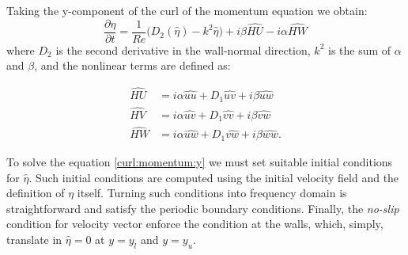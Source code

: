 Taking the y-component of the curl of the momentum equation we obtain:
\begin{equation}
\label{curl:momentum:y}
\frac{\partial \hat{\eta}}{\partial t}  = \frac{1}{Re}  \big( D_{2}(\hat{\eta}) - k^{2} \hat{\eta} \big) + i \beta \widehat{HU} -i \alpha \widehat{HW}
\end{equation}
where $D_{2}$ is the second derivative in the wall-normal direction, $k^{2}$ is the sum of $\alpha$ and $\beta$, and the nonlinear terms are defined as:

\begin{subequations}
\label{nonlinear:terms}
\begin{align}
\widehat{HU} &= i \alpha \widehat{uu} + D_{1} \widehat{uv} + i \beta \widehat{uw}\\ 
\widehat{HV} &= i \alpha \widehat{uv} + D_{1} \widehat{vv} + i \beta \widehat{vw}\\
\widehat{HW} &= i \alpha \widehat{uw} + D_{1} \widehat{vw} + i \beta \widehat{ww}.
\end{align}
\end{subequations}

To solve the equation \eqref{curl:momentum:y} we must set suitable initial conditions for $\hat{\eta}$. Such initial conditions are computed using the initial velocity field and the definition of $\eta$ itself.
Turning such conditions into frequency domain is straightforward and satisfy the periodic boundary conditions. Finally, the \emph{no-slip} condition for velocity vector enforce the condition at the walls, which, simply, translate in $\hat{\eta}=0$ at $y=y_{l}$ and $y=y_{u}$.


